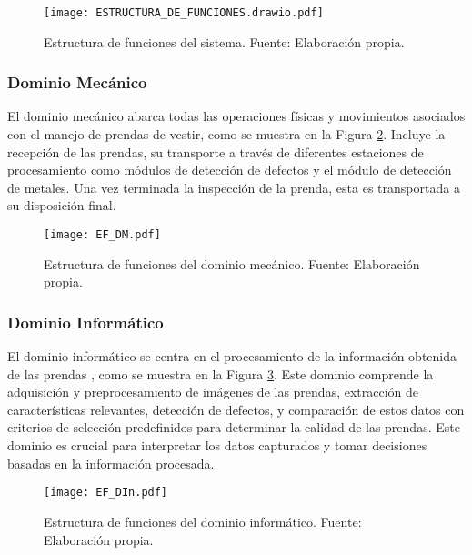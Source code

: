 \begin{figure}[H]
	\centering
	\texttt{[image: ESTRUCTURA\_DE\_FUNCIONES.drawio.pdf]}
	\caption[Estructura de funciones del sistema.]{Estructura de funciones del sistema. Fuente: Elaboración propia.}
	\label{fig:ESTRUCTURA_DE_FUNCIONES}
\end{figure}

\subsubsection{Dominio Mecánico}

El dominio mecánico abarca todas las operaciones físicas y movimientos asociados con el manejo de prendas de vestir, como se muestra en la Figura \ref{fig:EF_DM}. Incluye la recepción de las prendas, su transporte a través de diferentes estaciones de procesamiento como módulos de detección de defectos y el módulo de detección de metales. Una vez terminada la inspección de la prenda, esta es transportada a su disposición final.

\begin{figure}[H]
	\centering
	\texttt{[image: EF\_DM.pdf]}
	\caption[Estructura de funciones del dominio mecánico.]{Estructura de funciones del dominio mecánico. Fuente: Elaboración propia.}
	\label{fig:EF_DM}
\end{figure}

\subsubsection{Dominio Informático}

El dominio informático se centra en el procesamiento de la información obtenida de las prendas , como se muestra en la Figura \ref{fig:EF_DIn}. Este dominio comprende la adquisición y preprocesamiento de imágenes de las prendas, extracción de características relevantes, detección de defectos, y comparación de estos datos con criterios de selección predefinidos para determinar la calidad de las prendas. Este dominio es crucial para interpretar los datos capturados y tomar decisiones basadas en la información procesada.

\begin{figure}[H]
	\centering
	\texttt{[image: EF\_DIn.pdf]}
	\caption[Estructura de funciones del dominio informático.]{Estructura de funciones del dominio informático. Fuente: Elaboración propia.}
	\label{fig:EF_DIn}
\end{figure}

